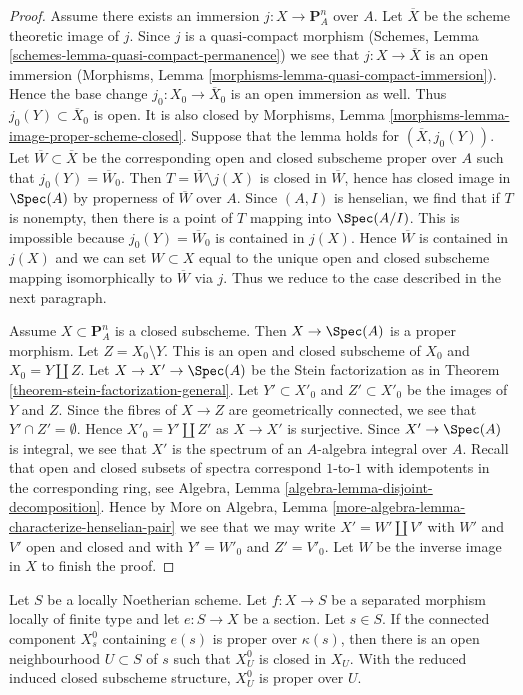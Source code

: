 \begin{proof}
\medskip\noindent
Assume there exists an immersion $j : X \to \mathbf{P}^n_A$ over $A$.
Let $\overline{X}$ be the scheme theoretic image of $j$.
Since $j$ is a quasi-compact morphism
(Schemes, Lemma \ref{schemes-lemma-quasi-compact-permanence})
we see that $j : X \to \overline{X}$ is an open immersion
(Morphisms, Lemma \ref{morphisms-lemma-quasi-compact-immersion}).
Hence the base change $j_0 : X_0 \to \overline{X}_0$
is an open immersion as well.
Thus $j_0(Y) \subset \overline{X}_0$ is open.
It is also closed by Morphisms, Lemma
\ref{morphisms-lemma-image-proper-scheme-closed}.
Suppose that the lemma holds for $(\overline{X}, j_0(Y))$.
Let $\overline{W} \subset \overline{X}$ be the
corresponding open and closed subscheme proper over $A$
such that $j_0(Y) = \overline{W}_0$.
Then $T = \overline{W} \setminus j(X)$ is closed in $\overline{W}$,
hence has closed image in $\Spec(A)$ by properness of $\overline{W}$
over $A$. Since $(A, I)$ is henselian, we find that if $T$
is nonempty, then there is a point of $T$ mapping into $\Spec(A/I)$.
This is impossible because $j_0(Y) = \overline{W}_0$ is contained in $j(X)$.
Hence $\overline{W}$ is contained in $j(X)$ and we can
set $W \subset X$ equal to the unique open and closed
subscheme mapping isomorphically to $\overline{W}$ via $j$.
Thus we reduce to the case described in the next paragraph.

\medskip\noindent
Assume $X \subset \mathbf{P}^n_A$ is a closed subscheme.
Then $X \to \Spec(A)$ is a proper morphism.
Let $Z = X_0 \setminus Y$. This is an open and closed
subscheme of $X_0$ and $X_0 = Y \amalg Z$.
Let $X \to X' \to \Spec(A)$ be the Stein factorization as in
Theorem \ref{theorem-stein-factorization-general}.
Let $Y' \subset X'_0$ and $Z' \subset X'_0$ be the images of
$Y$ and $Z$.
Since the fibres of $X \to Z$ are geometrically connected,
we see that $Y' \cap Z' = \emptyset$.
Hence $X'_0 = Y' \amalg Z'$ as $X \to X'$ is surjective.
Since $X' \to \Spec(A)$ is integral, we see that
$X'$ is the spectrum of an $A$-algebra integral over $A$.
Recall that open and closed subsets of spectra correspond
$1$-to-$1$ with idempotents in the corresponding ring, see
Algebra, Lemma \ref{algebra-lemma-disjoint-decomposition}.
Hence by
More on Algebra, Lemma \ref{more-algebra-lemma-characterize-henselian-pair}
we see that we may write $X' = W' \amalg V'$
with $W'$ and $V'$ open and closed and
with $Y' = W'_0$ and $Z' = V'_0$.
Let $W$ be the inverse image in $X$
to finish the proof.
\end{proof}

\begin{lemma}
\label{lemma-proper-connected-component-neighbourhood}
Let $S$ be a locally Noetherian scheme. Let $f : X \to S$ be a separated
morphism locally of finite type and let $e : S \to X$ be a section. Let
$s \in S$.
If the connected component $X_s^0$ containing $e(s)$ is proper over
$\kappa(s)$, then there is an open neighbourhood $U \subset S$ of $s$ such
that $X_U^0$ is closed in $X_U$. With the reduced induced closed subscheme
structure, $X_U^0$ is proper over $U$.
\end{lemma}

